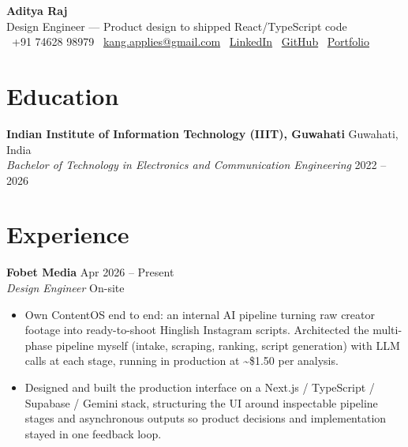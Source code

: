 \documentclass[a4paper,10pt]{article}
\begin{document}
\pagestyle{empty}

\begin{center}
    {\Huge \textbf{Aditya Raj}} \\ \vspace{4pt}
    {\color{secondary} Design Engineer --- Product design to shipped React/TypeScript code} \\ \vspace{4pt}
    \small
    \faPhone\ +91 74628 98979 \quad
    \faEnvelope\ \href{mailto:kang.applies@gmail.com}{kang.applies@gmail.com} \quad
    \faLinkedin\ \href{https://linkedin.com/in/aditya-raj-186509143}{LinkedIn} \quad
    \faGithub\ \href{https://github.com/Adityaraj0421}{GitHub} \quad
    \faGlobe\ \href{https://aditya-raj-portfolio-liart.vercel.app/}{Portfolio}
\end{center}

\section{Education}
\noindent
\textbf{Indian Institute of Information Technology (IIIT), Guwahati} \hfill Guwahati, India \\
\textit{Bachelor of Technology in Electronics and Communication Engineering} \hfill 2022 -- 2026

\section{Experience}

\noindent
\textbf{Fobet Media} \hfill Apr 2026 -- Present \\
\textit{Design Engineer} \hfill On-site
\begin{itemize}[noitemsep, topsep=0pt, leftmargin=1.5em]
    \item Own ContentOS end to end: an internal AI pipeline turning raw creator footage into ready-to-shoot Hinglish Instagram scripts. Architected the multi-phase pipeline myself (intake, scraping, ranking, script generation) with LLM calls at each stage, running in production at \textasciitilde{}\$1.50 per analysis.
    \item Designed and built the production interface on a Next.js / TypeScript / Supabase / Gemini stack, structuring the UI around inspectable pipeline stages and asynchronous outputs so product decisions and implementation stayed in one feedback loop.
\end{itemize}
\vspace{4pt}
\end{document}
